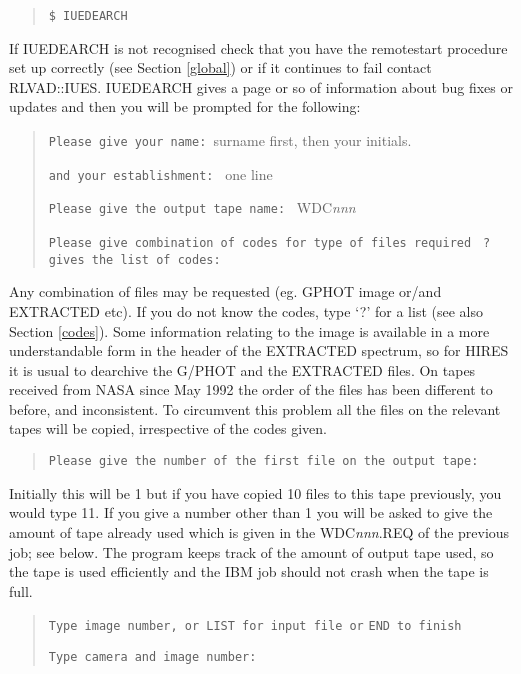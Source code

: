 \begin{quote}
{\tt \$ IUEDEARCH}
\end{quote}

If IUEDEARCH is not recognised check that you have the remotestart procedure 
set up correctly (see Section \ref{global}) or if it continues to fail
contact RLVAD::IUES.
IUEDEARCH gives a page or so of information about bug fixes or updates and
then you will be prompted for the following:

\begin{quote}
{\tt Please give your name: }surname first, then your initials.

{\tt and your establishment: } one line

{\tt Please give the output tape name: } WDC{\it nnn}

{\tt Please give combination of codes for type of files required }
\newline
{\tt ? gives the list of codes: }
\end{quote}

Any combination of files may be requested
(eg. GPHOT image or/and EXTRACTED etc).
If you do not know the codes, type `?' for a list (see also Section \ref{codes}).
Some information relating to
the image is available in a more understandable form in the header of the 
EXTRACTED spectrum, so for HIRES it is usual to dearchive the G/PHOT and the
EXTRACTED files. On tapes received from NASA since May 1992 the order of the
files has been different to before, and inconsistent. To circumvent this problem
all the files on the relevant tapes will be copied, irrespective of the codes
given.

\begin{quote}
{\tt Please give the number of the first file on the output tape: }
\end{quote}

Initially this will be 1 but if 
you have copied 10 files to this tape previously, you would type 11.
If you give a number other than 1 you will be asked to give the
amount of tape already used
which is given in the WDC{\it nnn}.REQ of the previous job; see below.
The program keeps track of the amount of output tape used, so the tape is used
efficiently and the IBM job should not crash when the tape is full.

\begin{quote}
{\tt Type image number, or LIST for input file or}
\newline
{\tt END to finish}

{\tt Type camera and image number: }
\end{quote}

